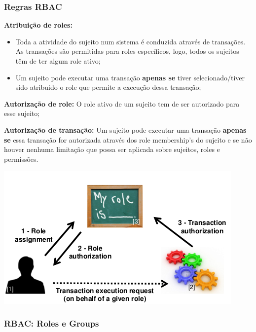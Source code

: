 \documentclass{article}
\begin{document}
\subsubsection{Regras RBAC}

\begin{flushleft}
  \textbf{Atribuição de roles:}
  \begin{itemize}
    \item Toda a atividade do sujeito num sistema é conduzida através de transações.
    As transações são permitidas para roles específicos, logo, todos os sujeitos têm de ter
    algum role ativo;
    \item Um sujeito pode executar uma transação \textbf{apenas se} tiver selecionado/tiver
    sido atribuido o role que permite a execução dessa transação;
  \end{itemize}

  \vspace{2mm}

  \textbf{Autorização de role:} O role ativo de um sujeito tem de ser autorizado para esse sujeito;

  \vspace{2mm}

  \textbf{Autorização de transação:} Um sujeito pode executar uma transação \textbf{apenas se}
  essa transação for autorizada através dos role membership's do sujeito e
  se não houver nenhuma limitação que possa ser aplicada sobre sujeitos, roles e permissões. 
\end{flushleft}

\begin{center}
  \includegraphics[scale=0.4]{15}
\end{center}

\subsubsection{RBAC: Roles e Groups}
\end{document}
